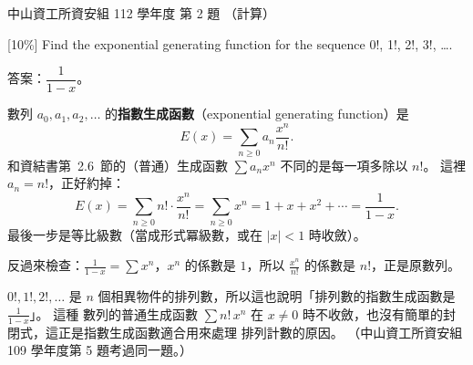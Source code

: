 \begin{pastexam}[label={px:nsysu-112-dmalg-02}]{中山資工所資安組 112 學年度 第 2 題}
（計算）

{[10\%]} Find the exponential generating function for the sequence 0!, 1!, 2!, 3!, \ldots.
\end{pastexam}

\begin{pastsoln}
答案：$\dfrac{1}{1 - x}$。

數列 $a_0, a_1, a_2, \ldots$ 的\textbf{指數生成函數}（exponential generating function）是
\[
E(x) = \sum_{n \ge 0} a_n \frac{x^n}{n!}.
\]
和資結書第~2.6~節的（普通）生成函數 $\sum a_n x^n$ 不同的是每一項多除以 $n!$。 這裡 $a_n = n!$，正好約掉：
\[
E(x) = \sum_{n \ge 0} n! \cdot \frac{x^n}{n!} = \sum_{n \ge 0} x^n = 1 + x + x^2 + \cdots = \frac{1}{1 - x}.
\]
最後一步是等比級數（當成形式冪級數，或在 $|x| < 1$ 時收斂）。

反過來檢查：$\frac{1}{1-x} = \sum x^n$，$x^n$ 的係數是 $1$，所以 $\frac{x^n}{n!}$ 的係數是 $n!$，正是原數列。

$0!, 1!, 2!, \ldots$ 是 $n$ 個相異物件的排列數，所以這也說明「排列數的指數生成函數是 $\frac{1}{1-x}$」。 這種
數列的普通生成函數 $\sum n!\, x^n$ 在 $x \ne 0$ 時不收斂，也沒有簡單的封閉式，這正是指數生成函數適合用來處理
排列計數的原因。 （中山資工所資安組 109 學年度第 5 題考過同一題。）
\end{pastsoln}
